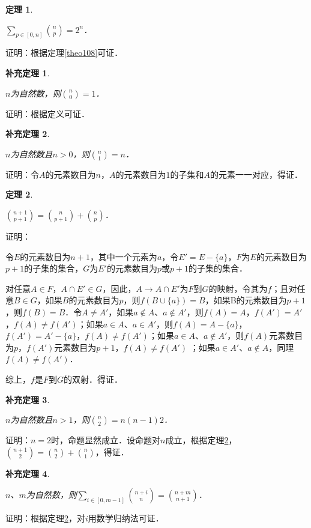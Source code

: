 \documentclass[12pt, a4paper, oneside]{book}
\newtheorem{theo}{定理}
\newtheorem{cor}{补充定理}
\begin{document}
			\begin{theo}\label{theo148}
				\hfill\par
				$\sum\limits_{p\in [0, n]}\binom{n}{p}=2^n$．
			\end{theo}
			证明：根据定理\ref{theo108}可证．
			
			\begin{cor}\label{cor324}
				\hfill\par
				$n$为自然数，则$\binom{n}{0}=1$．
			\end{cor}
			证明：根据定义可证．
			
			\begin{cor}\label{cor325}
				\hfill\par
				$n$为自然数且$n>0$，则$\binom{n}{1}=n$．
			\end{cor}
			证明：令$A$的元素数目为$n$，$A$的元素数目为$1$的子集和$A$的元素一一对应，得证．
			
			\begin{theo}\label{theo149}
				\hfill\par
				$\binom{n+1}{p+1}=\binom{n}{p+1}+\binom{n}{p}$．
			\end{theo}
			证明：
			\par
			令$E$的元素数目为$n+1$，其中一个元素为$a$，令$E'=E-\{a\}$，$F$为$E$的元素数目为$p+1$的子集的集合，$G$为$E'$的元素数目为$p$或$p+1$的子集的集合．
			\par
			对任意$A\in F$，$A\cap E'\in G$，因此，$A\to A\cap E'$为$F$到$G$的映射，令其为$f$；且对任意$B\in G$，如果$B$的元素数目为$p$，则$f(B\cup\{a\})=B$，如果B的元素数目为$p+1$，则$f(B)=B$．令$A\neq A'$，如果$a\notin A$、$a\notin A'$，则$f(A)=A$，$f(A')=A'$，$f(A)\neq f(A')$；如果$a\in A$、$a\in A'$，则$f(A)=A-\{a\}$，$f(A')=A'-\{a\}$，$f(A)\neq f(A')$；如果$a\in A$、$a\notin A'$，则$f(A)$元素数目为$p$，$f(A')$元素数目为$p+1$，$f(A)\neq f(A')$ ；如果$a\in A'$、$a\notin A$，同理$f(A)\neq f(A')$．
			\par
			综上，$f$是$F$到$G$的双射．得证．
			
			\begin{cor}\label{cor326}
				\hfill\par
				$n$为自然数且$n>1$，则$\binom{n}{2}=n(n-1)2$．
			\end{cor}
			证明：$n=2$时，命题显然成立．设命题对$n$成立，根据定理\ref{theo149}，$\binom{n+1}{2}=\binom{n}{2}+\binom{n}{1}$，得证．
			
			\begin{cor}\label{cor327}
				\hfill\par
				$n$、$m$为自然数，则$\sum\limits_{i\in [0, m-1]}\binom{n+i}{n}=\binom{n+m}{n+1}$．
			\end{cor}
			证明：根据定理\ref{theo149}，对$i$用数学归纳法可证．
			
\end{document}
